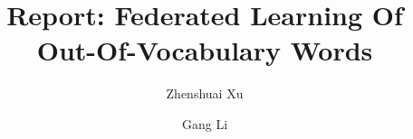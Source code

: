 \documentclass{amsart}
\begin{document}
%
%
\title[A Short Running Title]{Report: Federated Learning Of Out-Of-Vocabulary Words} %

\author{Zhenshuai Xu}
\address[A.~1]{School of Computer Science,\\ 
Jilin University, Changchun 130012, China}%

\author{Gang Li}
\address[A.~2]{School of Information Technology \\
Deakin University, Geelong, VIC 3216, Australia}%





\date{\gitAuthorDate}%




\maketitle
\tableofcontents

\newpage




\end{document}
